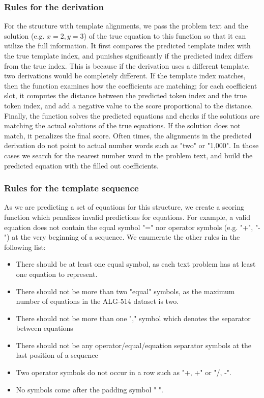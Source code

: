 \documentclass[11pt,letterpaper]{article}
\begin{document}
\subsubsection{Rules for the derivation}
For the structure with template alignments, we pass the problem text and the solution (e.g. $x=2, y=3$) of the true equation to this function so that it can utilize the full information. It first compares the predicted template index with the true template index, and punishes significantly if the predicted index differs from the true index. This is because if the derivation uses a different template, two derivations would be completely different. If the template index matches, then the function examines how the coefficients are matching; for each coefficient slot, it computes the distance between the predicted token index and the true token index, and add a negative value to the score proportional to the distance. Finally, the function solves the predicted equations and checks if the solutions are matching the actual solutions of the true equations. If the solution does not match, it penalizes the final score. Often times, the alignments in the predicted derivation do not point to actual number words such as "two" or "1,000". In those cases we search for the nearest number word in the problem text, and build the predicted equation with the filled out coefficients.
%
\subsubsection{Rules for the template sequence}
As we are predicting a set of equations for this structure, we create a scoring function which penalizes invalid predictions for equations. For example, a valid equation does not contain the equal symbol "=" nor operator symbols (e.g. "+", "-") at the very beginning of a sequence. We enumerate the other rules in the following list:
\begin{itemize}
\item There should be at least one equal symbol, as each text problem has at least one equation to represent.
\item There should not be more than two "equal" symbols, as the maximum number of equations in the ALG-514 dataset is two.
\item There should not be more than one "," symbol which denotes the separator between equations
\item There should not be any operator/equal/equation separator symbols at the last position of a sequence
\item Two operator symbols do not occur in a row such as "+, +" or "/, -".
\item No symbols come after the padding symbol " ".
\end{itemize}
% 
\end{document}
